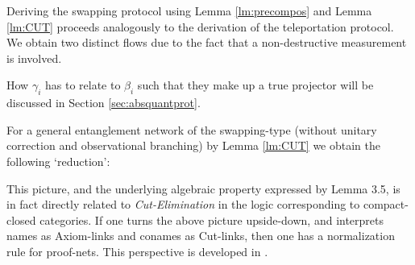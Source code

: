 \documentclass[10pt]{article}
\begin{document}
Deriving the swapping protocol using
Lemma \ref{lm:precompos} and Lemma \ref{lm:CUT} proceeds analogously
to the derivation of the teleportation protocol. We obtain
two distinct flows due to the fact that a non-destructive
measurement is involved.

\vspace{1.8mm}
 
\vspace{-3mm}
How $\gamma_i$ has to relate to $\beta_i$ such that they make up a true projector
will be discussed in Section \ref{sec:absquantprot}.

For a general entanglement
network of the swapping-type (without unitary correction and
observational branching) by Lemma
\ref{lm:CUT} we obtain the following `reduction':\vspace{-0mm}

\vspace{1.8mm}
 
\vspace{-3mm}\noindent
This picture, and the underlying algebraic property expressed by Lemma 
3.5, is in fact directly related to \emph{Cut-Elimination} in the
logic corresponding to compact-closed categories. If one turns the
above picture upside-down, and interprets names as Axiom-links and
conames as Cut-links, then one has a normalization rule for
proof-nets. This  perspective is 
developed in \cite{Ross}.
\end{document}
